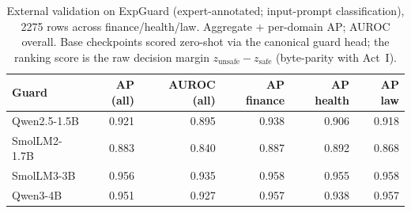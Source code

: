 \begin{table}[H]\centering\small
\caption{External validation on ExpGuard (expert-annotated; input-prompt classification), 2275 rows across finance/health/law. Aggregate + per-domain AP; AUROC overall. Base checkpoints scored zero-shot via the canonical guard head; the ranking score is the raw decision margin $z_{\text{unsafe}}-z_{\text{safe}}$ (byte-parity with Act~I).}
\label{tab:expguard}
\begin{tabular}{lrrrrr}\toprule
Guard & AP (all) & AUROC (all) & AP finance & AP health & AP law \\
\midrule
Qwen2.5-1.5B & 0.921 & 0.895 & 0.938 & 0.906 & 0.918 \\
SmolLM2-1.7B & 0.883 & 0.840 & 0.887 & 0.892 & 0.868 \\
SmolLM3-3B & 0.956 & 0.935 & 0.958 & 0.955 & 0.958 \\
Qwen3-4B & 0.951 & 0.927 & 0.957 & 0.938 & 0.957 \\
\bottomrule
\end{tabular}
\end{table}
